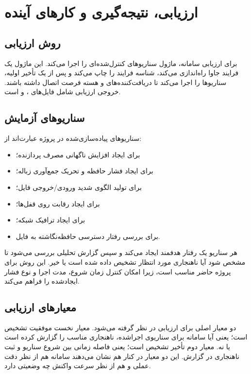 \chapter{ارزیابی، نتیجه‌گیری و کارهای آینده}

\section{روش ارزیابی}
برای ارزیابی سامانه، ماژول  سناریوهای کنترل‌شده‌ای را اجرا می‌کند. این ماژول یک فرایند جاوا راه‌اندازی می‌کند، شناسه فرایند را چاپ می‌کند و پس از یک تأخیر اولیه، سناریوها را اجرا می‌کند تا دریافت‌کننده‌های  و هسته فرصت اتصال داشته باشند. خروجی ارزیابی شامل فایل‌های ،  و  است.

\section{سناریوهای آزمایش}
سناریوهای پیاده‌سازی‌شده در پروژه عبارت‌اند از:
\begin{itemize}
\item {} برای ایجاد افزایش ناگهانی مصرف پردازنده؛
\item {} برای ایجاد فشار حافظه و تحریک جمع‌آوری زباله؛
\item {} برای تولید الگوی شدید ورودی/خروجی فایل؛
\item {} برای ایجاد رقابت روی قفل‌ها؛
\item {} برای ایجاد ترافیک شبکه؛
\item {} برای بررسی رفتار دسترسی حافظه‌نگاشته به فایل.
\end{itemize}

هر سناریو یک رفتار هدفمند ایجاد می‌کند و سپس گزارش تحلیلی بررسی می‌شود تا مشخص شود آیا ناهنجاری مورد انتظار تشخیص داده شده است یا خیر. این روش برای پروژه حاضر مناسب است، زیرا امکان کنترل زمان شروع، مدت اجرا و نوع فشار ایجادشده را فراهم می‌کند.

\section{معیارهای ارزیابی}
دو معیار اصلی برای ارزیابی در نظر گرفته می‌شود. معیار نخست موفقیت تشخیص است؛ یعنی آیا سامانه برای سناریوی اجراشده، ناهنجاری مناسب را گزارش کرده است یا نه. معیار دوم تأخیر تشخیص است؛ یعنی فاصله زمانی بین شروع سناریو و ثبت ناهنجاری در گزارش. این دو معیار در کنار هم نشان می‌دهند سامانه هم از نظر دقت عملی و هم از نظر سرعت واکنش چه وضعیتی دارد.

